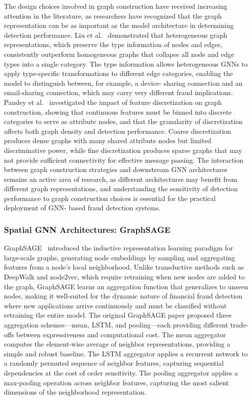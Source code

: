 The design choices involved in graph construction have received increasing
attention in the literature, as researchers have recognized that the graph
representation can be as important as the model architecture in determining
detection performance. Liu et al.~\cite{liu2021heterogeneous} demonstrated that
heterogeneous graph representations, which preserve the type information of
nodes and edges, consistently outperform homogeneous graphs that collapse all
node and edge types into a single category. The type information allows
heterogeneous GNNs to apply type-specific transformations to different edge
categories, enabling the model to distinguish between, for example, a device-
sharing connection and an email-sharing connection, which may carry very
different fraud implications. Pandey et al.~\cite{pandey2022graph} investigated
the impact of feature discretization on graph construction, showing that
continuous features must be binned into discrete categories to serve as
attribute nodes, and that the granularity of discretization affects both graph
density and detection performance. Coarse discretization produces dense graphs
with many shared attribute nodes but limited discriminative power, while fine
discretization produces sparse graphs that may not provide sufficient
connectivity for effective message passing. The interaction between graph
construction strategies and downstream GNN architectures remains an active area
of research, as different architectures may benefit from different graph
representations, and understanding the sensitivity of detection performance to
graph construction choices is essential for the practical deployment of GNN-
based fraud detection systems.

\subsubsection{Spatial GNN Architectures: GraphSAGE}

GraphSAGE~\cite{hamilton2017inductive} introduced the inductive representation
learning paradigm for large-scale graphs, generating node embeddings by sampling
and aggregating features from a node's local neighborhood. Unlike transductive
methods such as DeepWalk and node2vec, which require retraining when new nodes
are added to the graph, GraphSAGE learns an aggregation function that
generalizes to unseen nodes, making it well-suited for the dynamic nature of
financial fraud detection where new applications arrive continuously and must be
classified without retraining the entire model. The original GraphSAGE paper
proposed three aggregation schemes---mean, LSTM, and pooling---each providing
different trade-offs between expressiveness and computational cost. The mean
aggregator computes the element-wise average of neighbor representations,
providing a simple and robust baseline. The LSTM aggregator applies a recurrent
network to a randomly permuted sequence of neighbor features, capturing
sequential dependencies at the cost of order sensitivity. The pooling aggregator
applies a max-pooling operation across neighbor features, capturing the most
salient dimensions of the neighborhood representation.

